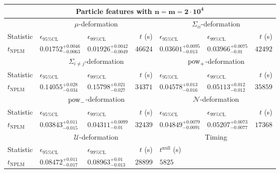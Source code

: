 \begin{tabular}{l|llr|llr}
	\toprule
	\multicolumn{7}{c}{{\bf Particle features with $\mathbf{n=m=2\cdot 10^{4}}$}} \\
	\toprule
	\multicolumn{1}{c}{} & \multicolumn{3}{c}{$\mu$-deformation} & \multicolumn{3}{c}{$\Sigma_{ii}$-deformation} \\
	Statistic & $\epsilon_{95\%\mathrm{CL}}$ & $\epsilon_{99\%\mathrm{CL}}$ & $t$ (s) & $\epsilon_{95\%\mathrm{CL}}$ & $\epsilon_{99\%\mathrm{CL}}$ & $t$ (s) \\
	\midrule
	$t_{\mathrm{NPLM}}$ & $0.01752_{-0.0063}^{+0.0046}$ & $0.01926_{-0.0049}^{+0.0042}$ & $46624$ & $0.03601_{-0.013}^{+0.0095}$ & $0.03966_{-0.01}^{+0.0075}$ & $42492$ \\
	\toprule
	\multicolumn{1}{c}{} & \multicolumn{3}{c}{$\Sigma_{i\neq j}$-deformation} & \multicolumn{3}{c}{$\rm{pow}_{+}$-deformation} \\
	Statistic & $\epsilon_{95\%\mathrm{CL}}$ & $\epsilon_{99\%\mathrm{CL}}$ & $t$ (s) & $\epsilon_{95\%\mathrm{CL}}$ & $\epsilon_{99\%\mathrm{CL}}$ & $t$ (s) \\
	\midrule
	$t_{\mathrm{NPLM}}$ & $0.14055_{-0.034}^{+0.028}$ & $0.15798_{-0.027}^{+0.021}$ & $34371$ & $0.04578_{-0.016}^{+0.013}$ & $0.05113_{-0.012}^{+0.012}$ & $35859$ \\
	\toprule
	\multicolumn{1}{c}{} & \multicolumn{3}{c}{$\rm{pow}_{-}$-deformation} & \multicolumn{3}{c}{$\mathcal{N}$-deformation} \\
	Statistic & $\epsilon_{95\%\mathrm{CL}}$ & $\epsilon_{99\%\mathrm{CL}}$ & $t$ (s) & $\epsilon_{95\%\mathrm{CL}}$ & $\epsilon_{99\%\mathrm{CL}}$ & $t$ (s) \\
	\midrule
	$t_{\mathrm{NPLM}}$ & $0.03843_{-0.015}^{+0.011}$ & $0.04311_{-0.01}^{+0.0099}$ & $32439$ & $0.04849_{-0.0091}^{+0.0079}$ & $0.05207_{-0.0077}^{+0.0073}$ & $17368$ \\
	\toprule
	\multicolumn{1}{c}{} & \multicolumn{3}{c}{$\mathcal{U}$-deformation} & \multicolumn{3}{c}{Timing} \\
	Statistic & $\epsilon_{95\%\mathrm{CL}}$ & $\epsilon_{99\%\mathrm{CL}}$ & $t$ (s) & $t^{\mathrm{null}}$ (s) \\
	\midrule
	$t_{\mathrm{NPLM}}$ & $0.08472_{-0.017}^{+0.011}$ & $0.08963_{-0.013}^{+0.01}$ & $28899$ & $5825$ \\
	\bottomrule
\end{tabular}